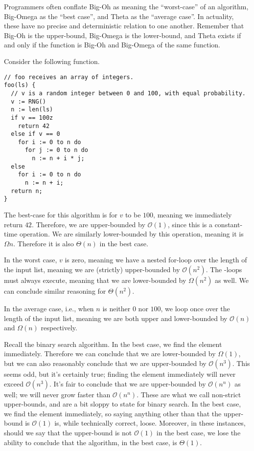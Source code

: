 Programmers often conflate Big-Oh as meaning the ``worst-case'' of an algorithm, Big-Omega as the ``best case'', and Theta as the ``average case''. In actuality, these have no precise and deterministic relation to one another. Remember that Big-Oh is the upper-bound, Big-Omega is the lower-bound, and Theta exists if and only if the function is Big-Oh and Big-Omega of the same function.

\example Consider the following function.
\begin{verbatim}
// foo receives an array of integers.
foo(ls) {
  // v is a random integer between 0 and 100, with equal probability.
  v := RNG()
  n := len(ls)
  if v == 100z
    return 42
  else if v == 0
    for i := 0 to n do
      for j := 0 to n do
        n := n + i * j;
  else
    for i := 0 to n do
      n := n + i;
  return n;
}
\end{verbatim}

The best-case for this algorithm is for $v$ to be $100$, meaning we immediately return $42$. Therefore, we are upper-bounded by $\mathcal{O}(1)$, since this is a constant-time operation. We are similarly lower-bounded by this operation, meaning it is $\Omega{n}$. Therefore it is also $\Theta(n)$ in the best case.

In the worst case, $v$ is zero, meaning we have a nested for-loop over the length of the input list, meaning we are (strictly) upper-bounded by $\mathcal{O}(n^2)$. The -loops must always execute, meaning that we are lower-bounded by $\Omega(n^2)$ as well. We can conclude similar reasoning for $\Theta(n^2)$.

In the average case, i.e., when $n$ is neither $0$ nor $100$, we loop once over the length of the input list, meaning we are both upper and lower-bounded by $\mathcal{O}(n)$ and $\Omega(n)$ respectively.

\example Recall the binary search algorithm. In the best case, we find the element immediately. Therefore we can conclude that we are lower-bounded by $\Omega(1)$, but we can also reasonably conclude that we are upper-bounded by $\mathcal{O}(n^3)$. This seems odd, but it's certainly true; finding the element immediately will never exceed $\mathcal{O}(n^3)$. It's fair to conclude that we are upper-bounded by $\mathcal{O}(n^n)$ as well; we will never grow faster than $\mathcal{O}(n^n)$. These are what we call non-strict upper-bounds, and are a bit sloppy to state for binary search. In the best case, we find the element immediately, so saying anything other than that the upper-bound is $\mathcal{O}(1)$ is, while technically correct, loose. Moreover, in these instances, should we say that the upper-bound is not $\mathcal{O}(1)$ in the best case, we lose the ability to conclude that the algorithm, in the best case, is $\Theta(1)$. 

